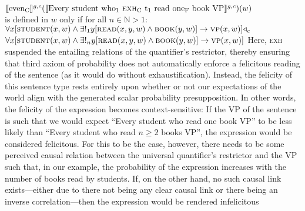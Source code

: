\xe
\ex{}
$\intension[g,c]{even\textsubscript{C}}(\intension[g,c]{Every student who\textsubscript{1} {\scshape exh}\textsubscript{C} t\textsubscript{1} read one\textsubscript{F} book VP})(w)$\\is defined in $w$ only if for all $n\in\mathbb{N}>1$:\\$\forall{x}[\predicate{student}(x,w)\land\exists!_1{y}[\predicate{read}(x,y,w)\land\predicate{book}(y,w)]\rightarrow\predicate{vp}(x,w)]\lprob_c$\\\emptyfill$\forall{x}[\predicate{student}(x,w)\land\exists!_n{y}[\predicate{read}(x,y,w)\land\predicate{book}(y,w)]\rightarrow\predicate{vp}(x,w)]$
\xe
Here, {\scshape exh} suspended the entailing relations of the quantifier's restrictor, thereby ensuring that  third axiom of probability does not automatically enforce a felicitous reading of the sentence (as it would do without exhaustification). Instead, the felicity of this sentence type rests entirely upon whether or not our expectations of the world align with the generated scalar probability presupposition. In other words, the felicity of the expression becomes context-sensitive: If the VP of the sentence is such that we would expect \enquote{Every student who read one book VP} to be less likely than \enquote{Every student who read $n\geqslant2$ books VP}, the expression would be considered felicitous. For this to be the case, however, there needs to be some perceived causal relation between the universal quantifier's restrictor and the VP such that, in our example, the probability of the expression increases with the number of books read by students. If, on the other hand, no such causal link exists---either due to there not being any clear causal link or there being an inverse correlation---then the expression would be rendered infelicitous \parencite[p.~136]{Crnic2014-dogma}


